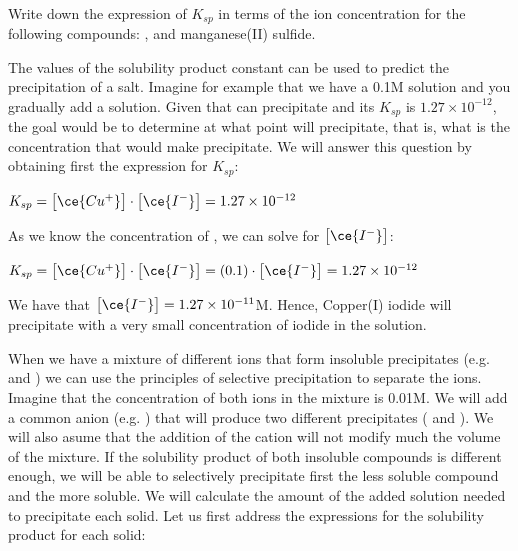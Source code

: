 \documentclass[main.tex]{subfiles}
\begin{document}
\begin{description}
\begin{example}
\faDiamond\ \\
Write down the expression of $K_{sp}$ in terms of the ion concentration for the following compounds: , and manganese(II) sulfide.
\\
\end{example}%

\item[\docfilehook{Predicting precipitation: an introduction}{Predicting precipitation: an introduction}]
The values of the solubility product constant can be used to predict the precipitation of a salt. Imagine for example that we have a 0.1M  solution and you gradually add a  solution. Given that  can precipitate and its $K_{sp}$ is $1.27\times 10^{-12}$, the goal would be to determine at what point will  precipitate, that is, what is the  concentration that would make  precipitate. We will answer this question by obtaining first the expression for $K_{sp}$:
\begin{center}\hfill $K_{sp}= \big[ \ce{Cu^{+}} \big]\cdot \big[ \ce{I^{-}} \big]=1.27\times 10^{-12}$\end{center}
As we know the concentration of , we can solve for $\big[ \ce{I^{-}} \big]$:
\begin{center}$K_{sp}= \big[ \ce{Cu^{+}} \big]\cdot \big[ \ce{I^{-}} \big]=(0.1)\cdot\big[ \ce{I^{-}} \big]=1.27\times 10^{-12}$\end{center}
We have that $\big[ \ce{I^{-}} \big]=1.27\times 10^{-11}$M. Hence, Copper(I) iodide will precipitate with a very small concentration of iodide in the solution. 
\item[\docfilehook{Selective precipitation}{Selective precipitation}] When we have a mixture of different ions that form insoluble precipitates (e.g.  and ) we can use the principles of selective precipitation to separate the ions. Imagine that the concentration of both ions in the mixture is 0.01M. We will add a common anion (e.g. ) that will produce two different precipitates ( and ). We will also asume that the addition of the cation will not modify much the volume of the mixture. If the solubility product of both insoluble compounds is different enough, we will be able to selectively precipitate first the less soluble compound and the more soluble. We will calculate the amount of the added solution needed to precipitate each solid. Let us first address the expressions for the solubility product for each solid:

\end{description}
\end{document}
